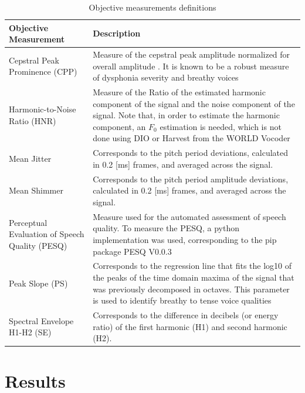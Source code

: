 \documentclass[final,5p,times,twocolumn]{elsarticle}
\begin{document}
\begin{table}[!htpb]
    \centering
    \begin{tabular}{p{} p{}}
        \hline \hline
        \textbf{Objective Measurement}                 & \textbf{Description} \\ \hline
        Cepstral Peak Prominence (CPP)                 & Measure of the cepstral peak amplitude normalized for overall amplitude \cite{Hillenbrand1994}. It is known to be a robust measure of dysphonia severity and breathy voices \cite{Fraile2014} \\
        Harmonic-to-Noise Ratio (HNR)                 &   Measure of the Ratio of the estimated harmonic component of the signal and the noise component of the signal. Note that, in order to estimate the harmonic component, an $F_0$ estimation is needed, which is not done using DIO or Harvest from the WORLD Vocoder \\
        Mean Jitter                                    & Corresponds to the pitch period deviations, calculated in 0.2 [ms] frames, and averaged across the signal\cite{opensmile}. \\
        Mean Shimmer                                   &              Corresponds to the pitch period amplitude deviations, calculated in 0.2 [ms] frames, and averaged across the signal\cite{opensmile}. \\
        Perceptual Evaluation of Speech Quality (PESQ) &        Measure used for the automated assessment of speech quality. To measure the PESQ, a python implementation was used, corresponding to the pip package PESQ V0.0.3 \\
        Peak Slope (PS)                                & Corresponds to the regression line that fits the log10 of the peaks of the time domain maxima of the signal that was previously decomposed in octaves. This parameter is used to identify breathy to tense voice qualities \cite{Kane_identifyingregions} \\
        Spectral Envelope H1-H2 (SE)                   & Corresponds to the difference in decibels (or energy ratio) of the first harmonic (H1) and second harmonic (H2). \\ \hline \hline
    \end{tabular}
    \caption{Objective measurements definitions}
    \label{tab:objectexpl}
\end{table}

\section{Results}
\end{document}
